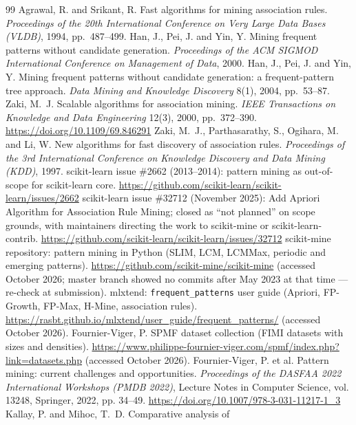 \documentclass[twocolumn,10pt]{article}
\begin{document}
\begin{thebibliography}{99}
 Agrawal, R. and Srikant, R. Fast algorithms for
mining association rules. \emph{Proceedings of the 20th International
Conference on Very Large Data Bases (VLDB)}, 1994, pp.~487--499.
 Han, J., Pei, J. and Yin, Y. Mining frequent patterns
without candidate generation. \emph{Proceedings of the ACM SIGMOD
International Conference on Management of Data}, 2000.
 Han, J., Pei, J. and Yin, Y. Mining frequent patterns
without candidate generation: a frequent-pattern tree approach.
\emph{Data Mining and Knowledge Discovery} 8(1), 2004, pp.~53--87.
 Zaki, M.~J. Scalable algorithms for association
mining. \emph{IEEE Transactions on Knowledge and Data Engineering}
12(3), 2000, pp.~372--390. \url{https://doi.org/10.1109/69.846291}
 Zaki, M.~J., Parthasarathy, S., Ogihara, M. and
Li, W. New algorithms for fast discovery of association rules.
\emph{Proceedings of the 3rd International Conference on Knowledge
Discovery and Data Mining (KDD)}, 1997.
 scikit-learn issue \#2662 (2013--2014): pattern
mining as out-of-scope for scikit-learn core.
\url{https://github.com/scikit-learn/scikit-learn/issues/2662}
 scikit-learn issue \#32712 (November 2025): Add
Apriori Algorithm for Association Rule Mining; closed as ``not
planned'' on scope grounds, with maintainers directing the work to
scikit-mine or scikit-learn-contrib.
\url{https://github.com/scikit-learn/scikit-learn/issues/32712}
 scikit-mine repository: pattern mining in Python
(SLIM, LCM, LCMMax, periodic and emerging patterns).
\url{https://github.com/scikit-mine/scikit-mine} (accessed October 2026;
master branch showed no commits after May 2023 at that time ---
re-check at submission).
 mlxtend: \texttt{frequent\_patterns} user guide
(Apriori, FP-Growth, FP-Max, H-Mine, association rules).
\url{https://rasbt.github.io/mlxtend/user_guide/frequent_patterns/}
(accessed October 2026).
 Fournier-Viger, P. SPMF dataset collection (FIMI
datasets with sizes and densities).
\url{https://www.philippe-fournier-viger.com/spmf/index.php?link=datasets.php}
(accessed October 2026).
 Fournier-Viger, P. et al. Pattern mining:
current challenges and opportunities. \emph{Proceedings of the DASFAA 2022
International Workshops (PMDB 2022)}, Lecture Notes in Computer Science, vol. 13248,
Springer, 2022, pp. 34--49. \url{https://doi.org/10.1007/978-3-031-11217-1_3}
 Kallay, P. and Mihoc, T.~D. Comparative analysis of

\end{thebibliography}
\end{document}
